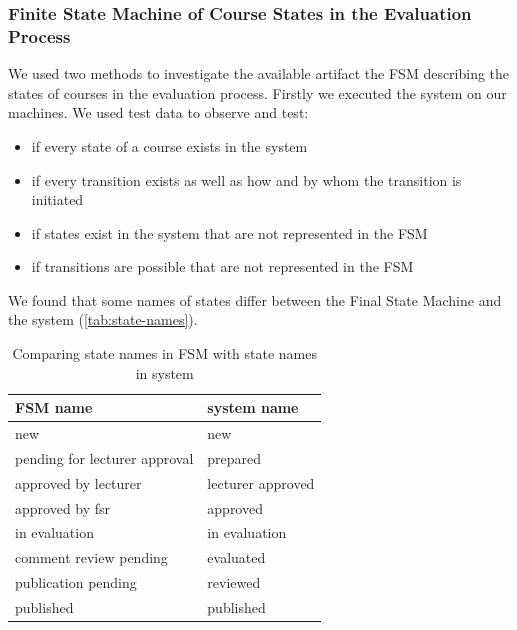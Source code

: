 \subsubsection{Finite State Machine of Course States in the Evaluation Process}
We used two methods to investigate the available artifact the FSM describing the states of courses in the evaluation process.
Firstly we executed the system on our machines.
We used test data to observe and test:

\begin{itemize}
    \item if every state of a course exists in the system
    \item if every transition exists as well as how and by whom the transition is initiated
    \item if states exist in the system that are not represented in the FSM
    \item if transitions are possible that are not represented in the FSM
\end{itemize} 

We found that some names of states differ between the Final State Machine and the system (\autoref{tab:state-names}).
\begin{table}[h]
    \centering
    \begin{tabular}{|l|l|}
        \hline
        FSM name                      & system name       \\ \hline \hline
        new                           & new               \\ \hline
        pending for lecturer approval & prepared          \\ \hline
        approved by lecturer          & lecturer approved \\ \hline
        approved by fsr               & approved          \\ \hline
        in evaluation                 & in evaluation     \\ \hline
        comment review pending        & evaluated         \\ \hline
        publication pending           & reviewed          \\ \hline
        published                     & published         \\ \hline
    \end{tabular}
    \caption{Comparing state names in FSM with state names in system}
    \label{tab:state-names}
\end{table}

